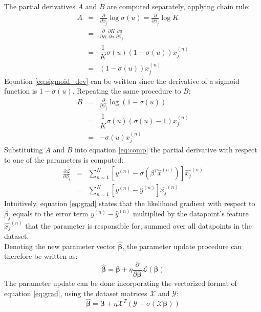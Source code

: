 \documentclass[journal]{IEEEtran}
\begin{document}
The partial derivatives $A$ and $B$ are computed separately, applying chain rule:
\begin{eqnarray}
    A &=&  \frac{\partial }{\partial \beta_j} \log \sigma (u) = \frac{\partial }{\partial \beta_j} \log K\\
    &=&  \frac{\partial }{\partial K}\frac{\partial K}{\partial u}\frac{\partial u}{\partial \beta_j}\\ \label{eq:sigmoid_dev}
    &=& \dfrac{1}{K}\sigma(u)(1-\sigma(u))x_j^{(n)}\\
    &=& (1-\sigma(u))x_j^{(n)}
\end{eqnarray}
Equation \ref{eq:sigmoid_dev} can be written since the derivative of a sigmoid function is $1-\sigma(u)$. Repeating the same procedure to $B$:
\begin{eqnarray}
    B &=&  \frac{\partial }{\partial \beta_j} \log (1 - \sigma (u)) \\
    &=& \dfrac{1}{K}\sigma(u)(\sigma(u)-1)x_j^{(n)}\\
    &=& -\sigma(u)x_j^{(n)}
\end{eqnarray}
Substituting $A$ and $B$ into equation \ref{eq:comp} the partial derivative with respect to one of the parameters is computed:
\begin{eqnarray}
   \frac{\partial \mathcal{L}}{\partial \beta_j} &=& \sum_{n=1}^N [y^{(n)} - \sigma(\beta^T\hat{x}^{(n)})]\hat{x_j}^{(n)}  \\
   &=& \sum_{n=1}^N [y^{(n)} -\hat{y}^{(n)}]\hat{x_j}^{(n)} \label{eq:grad}
\end{eqnarray}
Intuitively, equation \ref{eq:grad} states that the likelihood gradient with respect to $\beta_j$ equals to the error term $y^{(n)} -\hat{y}^{(n)}$ multiplied by the datapoint's feature $\hat{x_j}^{(n)}$ that the parameter is responsible for, summed over all datapoints in the dataset.\\
Denoting the new parameter vector $\hat{\bm{\beta}}$, the parameter update procedure can therefore be written as:
\begin{equation}
    \hat{\bm{\beta}} = \bm{\beta} + \eta \frac{\partial }{\partial \bm{\beta}} \mathcal{L}(\bm{\beta})
\end{equation}
The parameter update can be done incorporating the vectorized format of equation \ref{eq:grad}, using the dataset matrices $\mathcal{X}$ and $\mathcal{Y}$:
\begin{equation}
     \hat{\bm{\beta}} = \bm{\beta} + \eta \mathcal{X}^T(\mathcal{Y}-\sigma(\mathcal{X}\bm{\beta}))
\end{equation}
\end{document}
